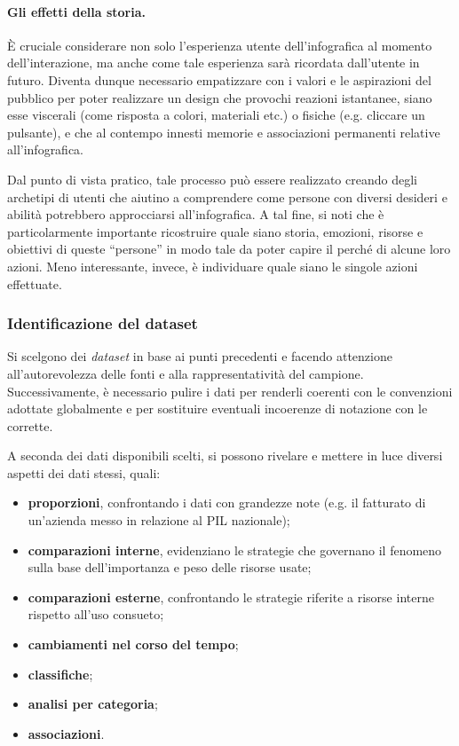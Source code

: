 \paragraph{Gli effetti della storia.} 
È cruciale considerare non solo l'esperienza utente dell'infografica al momento dell'interazione, ma anche come tale esperienza sarà ricordata dall'utente in futuro.
Diventa dunque necessario empatizzare con i valori e le aspirazioni del pubblico per poter realizzare un design che provochi reazioni istantanee, siano esse viscerali (come risposta a colori, materiali etc.) o fisiche (e.g. cliccare un pulsante), e che al contempo
innesti memorie e associazioni permanenti relative all'infografica.

\bigskip
\noindent Dal punto di vista pratico, tale processo può essere realizzato creando degli archetipi di utenti che aiutino a comprendere come persone con diversi desideri e abilità potrebbero approcciarsi all'infografica. 
A tal fine, si noti che è particolarmente importante ricostruire quale siano storia, emozioni, risorse e obiettivi di queste ``persone'' in modo tale da poter capire il perché di alcune loro azioni. Meno interessante, invece, è individuare
quale siano le singole azioni effettuate.

\subsubsection{Identificazione del dataset}
Si scelgono dei \emph{dataset} in base ai punti precedenti e facendo attenzione all'autorevolezza delle fonti e alla rappresentatività del campione.
Successivamente, è necessario pulire i dati per renderli coerenti con le convenzioni adottate globalmente e per sostituire eventuali incoerenze di notazione con le corrette.

A seconda dei dati disponibili scelti, si possono rivelare e mettere in luce diversi aspetti dei dati stessi, quali:
\begin{itemize}
    \item \textbf{proporzioni}, confrontando i dati con grandezze note (e.g. il fatturato di un'azienda messo in relazione al PIL nazionale);
    \item \textbf{comparazioni interne}, evidenziano le strategie che governano il fenomeno sulla base dell'importanza e peso delle risorse usate;
    \item \textbf{comparazioni esterne}, confrontando le strategie riferite a risorse interne rispetto all'uso consueto;
    \item \textbf{cambiamenti nel corso del tempo};
    \item \textbf{classifiche};
    \item \textbf{analisi per categoria};
    \item \textbf{associazioni}.
\end{itemize}	

